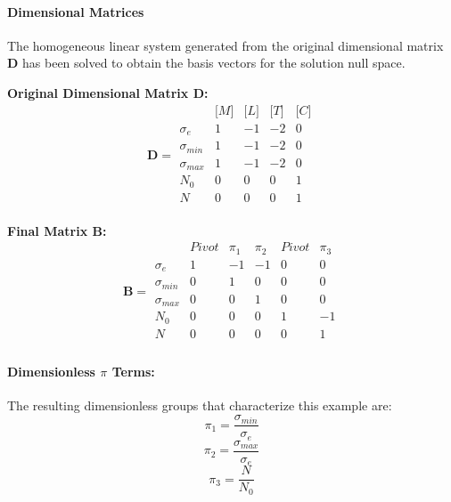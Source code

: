                 \paragraph{Dimensional Matrices}
                The homogeneous linear system generated from the original dimensional matrix $\mathbf{D}$ has been solved to obtain the basis vectors for the solution null space.

                \textbf{Original Dimensional Matrix $\mathbf{D}$:}
                \[\mathbf{D} = \begin{array}{r|rrrr}
                & \text{[}M\text{]} & \text{[}L\text{]} & \text{[}T\text{]} & \text{[}C\text{]} \\
                \hline
                \sigma_e & 1 & -1 & -2 & 0 \\
\sigma_{min} & 1 & -1 & -2 & 0 \\
\sigma_{max} & 1 & -1 & -2 & 0 \\
N_0 & 0 & 0 & 0 & 1 \\
N & 0 & 0 & 0 & 1 \\

                \end{array}\]


        \textbf{Final Matrix $\mathbf{B}$:}
        \[\mathbf{B} = \begin{array}{r|rrrrr}
        & Pivot & \pi_{1} & \pi_{2} & Pivot & \pi_{3} \\
        \hline
        \sigma_e & 1 & -1 & -1 & 0 & 0 \\
\sigma_{min} & 0 & 1 & 0 & 0 & 0 \\
\sigma_{max} & 0 & 0 & 1 & 0 & 0 \\
N_0 & 0 & 0 & 0 & 1 & -1 \\
N & 0 & 0 & 0 & 0 & 1 \\

        \end{array}\]

        \paragraph{Dimensionless $\pi$ Terms: }
        The resulting dimensionless groups that characterize this example are:
\begin{equation}
\pi_{1} = \frac{\sigma_{min}}{\sigma_e}
\end{equation}
\begin{equation}
\pi_{2} = \frac{\sigma_{max}}{\sigma_e}
\end{equation}
\begin{equation}
\pi_{3} = \frac{N}{N_0}
\end{equation}

